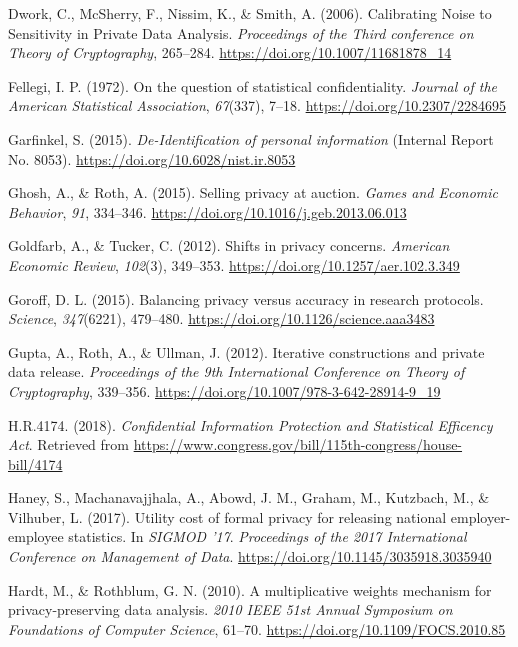 \documentclass[]{article}
\begin{document}
\hypertarget{ref-Dworketal:2006}{}
Dwork, C., McSherry, F., Nissim, K., \& Smith, A. (2006). Calibrating
Noise to Sensitivity in Private Data Analysis. \emph{Proceedings of the
Third conference on Theory of Cryptography}, 265--284.
\url{https://doi.org/10.1007/11681878_14}

\hypertarget{ref-Fellegi:1972}{}
Fellegi, I. P. (1972). On the question of statistical confidentiality.
\emph{Journal of the American Statistical Association}, \emph{67}(337),
7--18. \url{https://doi.org/10.2307/2284695}

\hypertarget{ref-Garfinkel:Deidentification:NIST:2015}{}
Garfinkel, S. (2015). \emph{De-Identification of personal information}
(Internal Report No. 8053). \url{https://doi.org/10.6028/nist.ir.8053}

\hypertarget{ref-Ghosh:Auction:GEB:2015}{}
Ghosh, A., \& Roth, A. (2015). Selling privacy at auction. \emph{Games
and Economic Behavior}, \emph{91}, 334--346.
\url{https://doi.org/10.1016/j.geb.2013.06.013}

\hypertarget{ref-Goldfarb:Shifts:AERPP:2012}{}
Goldfarb, A., \& Tucker, C. (2012). Shifts in privacy concerns.
\emph{American Economic Review}, \emph{102}(3), 349--353.
\url{https://doi.org/10.1257/aer.102.3.349}

\hypertarget{ref-Goroff2015}{}
Goroff, D. L. (2015). Balancing privacy versus accuracy in research
protocols. \emph{Science}, \emph{347}(6221), 479--480.
\url{https://doi.org/10.1126/science.aaa3483}

\hypertarget{ref-Gupta:2012:ICP:2238936.2238961}{}
Gupta, A., Roth, A., \& Ullman, J. (2012). Iterative constructions and
private data release. \emph{Proceedings of the 9th International
Conference on Theory of Cryptography}, 339--356.
\url{https://doi.org/10.1007/978-3-642-28914-9_19}

\hypertarget{ref-cipsea}{}
H.R.4174. (2018). \emph{Confidential Information Protection and
Statistical Efficency Act}. Retrieved from
\url{https://www.congress.gov/bill/115th-congress/house-bill/4174}

\hypertarget{ref-HaneySIGMOD2017}{}
Haney, S., Machanavajjhala, A., Abowd, J. M., Graham, M., Kutzbach, M.,
\& Vilhuber, L. (2017). Utility cost of formal privacy for releasing
national employer-employee statistics. In \emph{SIGMOD '17}.
\emph{Proceedings of the 2017 International Conference on Management of
Data}. \url{https://doi.org/10.1145/3035918.3035940}

\hypertarget{ref-Hardt:Multiplicative:FOCS10}{}
Hardt, M., \& Rothblum, G. N. (2010). A multiplicative weights mechanism
for privacy-preserving data analysis. \emph{2010 IEEE 51st Annual
Symposium on Foundations of Computer Science}, 61--70.
\url{https://doi.org/10.1109/FOCS.2010.85}
\end{document}
